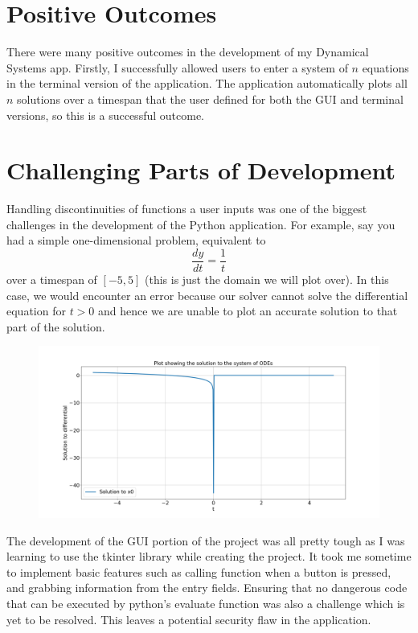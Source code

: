 \documentclass[12pt]{report}
\begin{document}
\section{Positive Outcomes}
There were many positive outcomes in the development of my Dynamical Systems app. Firstly, I successfully allowed users to enter a system of $n$ equations in the terminal version of the application. The application automatically plots all $n$ solutions over a timespan that the user defined for both the GUI and terminal versions, so this is a successful outcome.
\section{Challenging Parts of Development}
Handling discontinuities of functions a user inputs was one of the biggest challenges in the development of the Python application. For example, say you had a simple one-dimensional problem, equivalent to
\begin{equation*}
    \frac{dy}{dt} = \frac{1}{t} 
\end{equation*}
over a timespan of $[-5,5]$ (this is just the domain we will plot over). In this case, we would encounter an error because our solver cannot solve the differential equation for $t > 0$ and hence we are unable to plot an accurate solution to that part of the solution.
\begin{figure}[H]
    \centering
    \includegraphics[scale = 0.35]{Demo 5.png}
\end{figure}
The development of the GUI portion of the project was all pretty tough as I was learning to use the tkinter library while creating the project. It took me sometime to implement basic features such as calling function when a button is pressed, and grabbing information from the entry fields. Ensuring that no dangerous code that can be executed by python's evaluate function was also a challenge which is yet to be resolved. This leaves a potential security flaw in the application.
\end{document}
